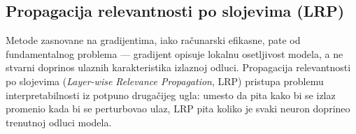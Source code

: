 


%
%


\subsection{Propagacija relevantnosti po slojevima (LRP)}

Metode zasnovane na gradijentima, iako računarski efikasne, pate od fundamentalnog 
problema — gradijent opisuje lokalnu osetljivost modela, a ne stvarni doprinos ulaznih 
karakteristika izlaznoj odluci. Propagacija relevantnosti po slojevima 
(\textit{Layer-wise Relevance Propagation}, LRP) \cite{bach2015pixel} pristupa problemu 
interpretabilnosti iz potpuno drugačijeg ugla: umesto da pita kako bi se izlaz 
promenio kada bi se perturbovao ulaz, LRP pita koliko je svaki neuron doprineo trenutnoj odluci modela.

